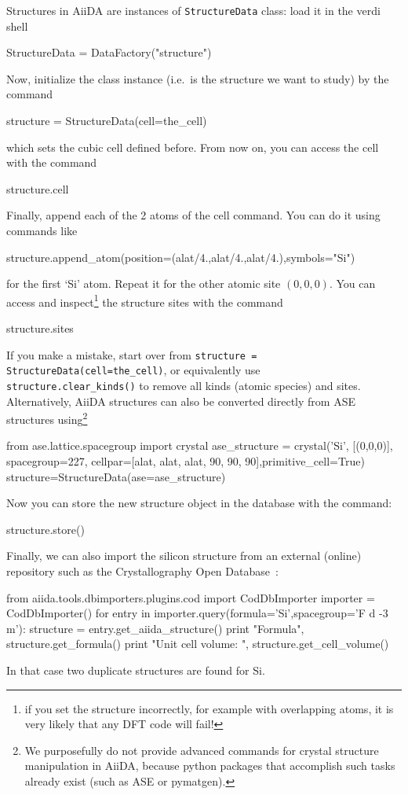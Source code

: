 Structures in AiiDA are instances of \texttt{StructureData} class: load it in the verdi shell
\begin{pythoncommand}
 StructureData = DataFactory("structure")
\end{pythoncommand}
Now, initialize the class instance (i.e.\ is the structure we want to study) by the command
\begin{pythoncommand}
 structure = StructureData(cell=the_cell)
\end{pythoncommand}
which sets the cubic cell defined before. From now on, you can access the cell with the command
\begin{pythoncommand}
 structure.cell
\end{pythoncommand}
Finally, append each of the 2 atoms of the cell command. You can do it
using commands like
\begin{pythoncommand}
 structure.append_atom(position=(alat/4.,alat/4.,alat/4.),symbols="Si")
\end{pythoncommand}
for the first `Si' atom. Repeat it for the other atomic site $\left(0,0,0\right)$.
You can access and inspect\footnote{if you set the structure incorrectly, for example with overlapping atoms, it is very likely that any DFT code will fail!} the structure sites with the command
\begin{pythoncommand}
 structure.sites
\end{pythoncommand}
If you make a mistake, start over from \texttt{structure = StructureData(cell=the\_cell)}, or equivalently use \\
\texttt{structure.clear\_kinds()} to remove all kinds (atomic species) and sites.
Alternatively, AiiDA structures can also be
converted directly from ASE~\cite{ref:ASE} structures using\footnote{We purposefully do not provide advanced commands
for crystal structure manipulation in AiiDA, because python packages that accomplish such tasks
already exist (such as ASE or pymatgen).}
\begin{pythoncommand}	
 from ase.lattice.spacegroup import crystal
 ase_structure = crystal('Si', [(0,0,0)], spacegroup=227,
                 cellpar=[alat, alat, alat, 90, 90, 90],primitive_cell=True)
 structure=StructureData(ase=ase_structure)
\end{pythoncommand}
%
Now you can store the new structure object in the database with the command:
\begin{pythoncommand}
 structure.store()
\end{pythoncommand}
%
%
Finally, we can also import the silicon structure from an external (online) repository
such as the Crystallography Open Database~\cite{ref:COD}:
\begin{pythoncommand}
from aiida.tools.dbimporters.plugins.cod import CodDbImporter 
importer = CodDbImporter()
for entry in importer.query(formula='Si',spacegroup='F d -3 m'):
        structure = entry.get_aiida_structure()
        print "Formula", structure.get_formula()
        print "Unit cell volume: ", structure.get_cell_volume()
\end{pythoncommand}
In that case two duplicate structures are found for Si.


